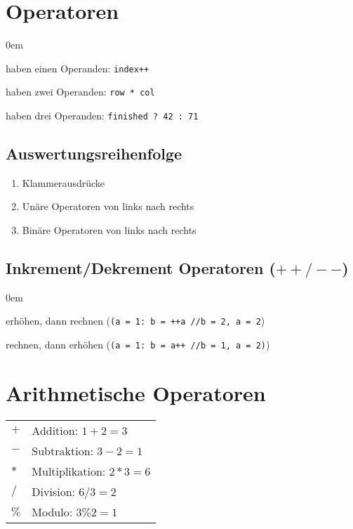 \section{Operatoren}
\begin{description}\itemsep0em
	\item [Unäre, monadische] haben einen Operanden: \texttt{index++}
	\item [Binäre, dyadische] haben zwei Operanden: \texttt{row * col}
	\item [Ternäre, tryadische] haben drei Operanden: \texttt{finished ? 42 : 71}
\end{description}

\subsection{Auswertungsreihenfolge}
\begin{enumerate}
	\item Klammerausdrücke
	\item Unäre Operatoren von links nach rechts
	\item Binäre Operatoren von links nach rechts
\end{enumerate}

\subsection{Inkrement/Dekrement Operatoren ($++/--$)}
\begin{description}\itemsep0em
	\item [links] erhöhen, dann rechnen (\texttt{(a = 1: b = ++a //b = 2, a = 2})
	\item [rechts] rechnen, dann erhöhen (\texttt{(a = 1: b = a++ //b = 1, a = 2)})
\end{description}

\section{Arithmetische Operatoren}
\settowidth{\MyLenA}{[\texttt{>>>}]~}
\begin{tabular}{@{}p{\the\MyLenA}%
				@{}p{(\linewidth - \the\MyLenA)}}
$+$ & Addition: $1 + 2 = 3$ \\
$-$ & Subtraktion: $3 - 2 = 1$\\
$*$ & Multiplikation: $2 * 3 = 6$\\
$/$ & Division: $6 / 3 = 2$\\
$\%$ & Modulo: $3 \% 2 = 1$\\
\end{tabular}

